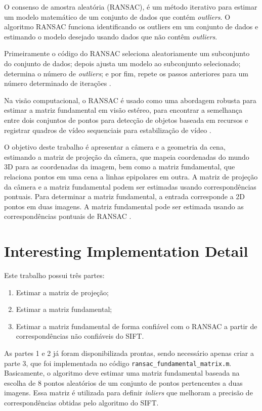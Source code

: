 O consenso de amostra aleatória (RANSAC), é um método iterativo para estimar um modelo matemático de um conjunto de dados que contém \textit{outliers}. O algoritmo RANSAC funciona identificando os outliers em um conjunto de dados e estimando o modelo desejado usando dados que não contêm \textit{outliers}\cite{Ransac}.

Primeiramente o código do RANSAC seleciona aleatoriamente um subconjunto do conjunto de dados; depois ajusta um modelo ao subconjunto selecionado; determina o número de \textit{outliers}; e por fim, repete os passos anteriores para um número determinado de iterações \cite{Ransac}.

Na visão computacional, o RANSAC é usado como uma abordagem robusta para estimar a matriz fundamental em visão estéreo, para encontrar a semelhança entre dois conjuntos de pontos para detecção de objetos baseada em recursos e registrar quadros de vídeo sequenciais para estabilização de vídeo \cite{Ransac}.

O objetivo deste trabalho é apresentar a câmera e a geometria da cena, estimando a matriz de projeção da câmera, que mapeia coordenadas do mundo 3D para as coordenadas da imagem, bem como a matriz fundamental, que relaciona pontos em uma cena a linhas epipolares em outra. A matriz de projeção da câmera e a matriz fundamental podem ser estimadas usando correspondências pontuais. Para determinar a matriz fundamental, a entrada corresponde a 2D pontos em duas imagens. A matriz fundamental pode ser estimada usando as correspondências pontuais de RANSAC \cite{Trab}.


\section*{Interesting Implementation Detail}
Este trabalho possui três partes:
\begin{enumerate}
\item Estimar a matriz de projeção;
\item Estimar a matriz fundamental;
\item Estimar a matriz fundamental de forma confiável com o RANSAC a partir de correspondências não confiáveis do SIFT.

\end{enumerate}

As partes 1 e 2 já foram disponibilizada prontas, sendo necessário apenas criar a parte 3, que foi implementada no código \texttt{ransac\_fundamental\_matrix.m}. Basicamente, o algoritmo deve estimar uma matriz fundamental baseada na escolha de 8 pontos aleatórios de um conjunto de pontos pertencentes a duas imagens. Essa matriz é utilizada para definir \textit{inliers}  que melhoram a precisão de correspondências obtidas pelo algoritmo do SIFT. 

